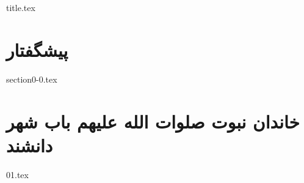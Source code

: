 \documentclass{book}
\begin{document}
\frontmatter
{title.tex}

\clearpage
\thispagestyle{empty}

\tableofcontents

\mainmatter

\renewcommand{\baselinestretch}{1.75}\normalsize

\chapter*{پیشگفتار}
{section0-0.tex}

\chapter{خاندان نبوت صلوات الله علیهم باب شهر دانشند}

{01.tex}


\end{document}
